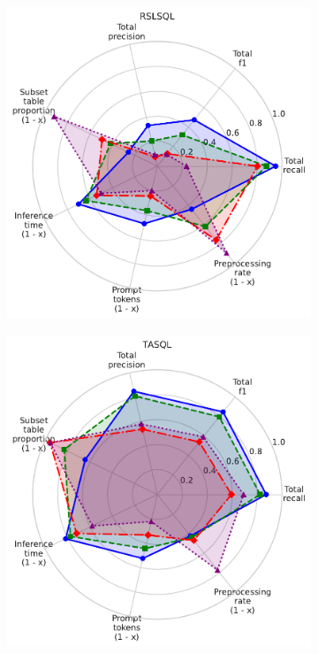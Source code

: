 \begin{figure}
\begin{subfigure}{0.235\linewidth}
  \end{subfigure}
  \begin{subfigure}{0.235\linewidth}
    \centering
    \includegraphics[width=\linewidth]{figures/method_radar_charts/rslsql_radar.pdf}
  \end{subfigure}
  \begin{subfigure}{0.235\linewidth}
    \centering
    \includegraphics[width=\linewidth]{figures/method_radar_charts/tasql_radar.pdf}

\end{subfigure}
\end{figure}
